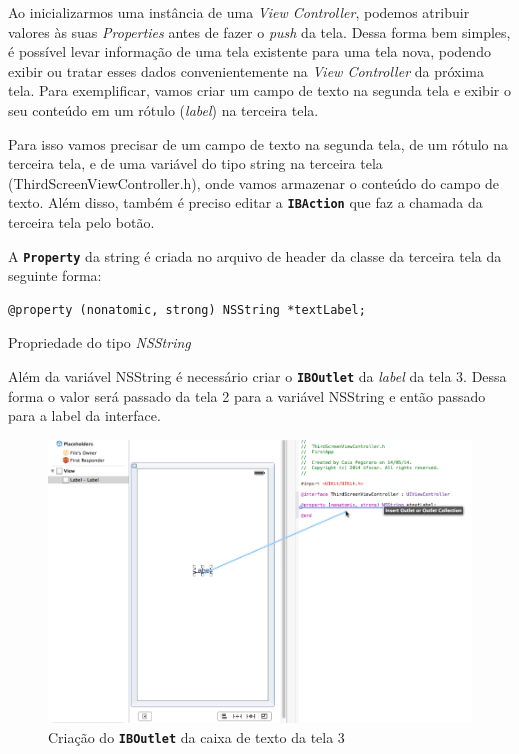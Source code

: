 \documentclass[a4paper,12pt,brazil,oneside]{book}
\begin{document}
Ao inicializarmos uma instância de uma \emph{View Controller}, podemos atribuir valores às suas \emph{Properties} antes de fazer o \emph{push} da tela. Dessa forma bem simples, é possível levar informação de uma tela existente para uma tela nova, podendo exibir ou tratar esses dados convenientemente na \emph{View Controller} da próxima tela. Para exemplificar, vamos criar um campo de texto na segunda tela e exibir o seu conteúdo em um rótulo (\emph{label}) na terceira tela.

Para isso vamos precisar de um campo de texto na segunda tela, de um rótulo na terceira tela, e de uma variável do tipo string na terceira tela (ThirdScreenViewController.h), onde vamos armazenar o conteúdo do campo de texto. Além disso, também é preciso editar a \texttt{\textbf{IBAction}} que faz a chamada da terceira tela pelo botão.

A \texttt{\textbf{Property}} da string é criada no arquivo de header da classe da terceira tela da seguinte forma:

\begin{listing}[H]
\begin{verbatim}
@property (nonatomic, strong) NSString *textLabel;
\end{verbatim}
\caption{Propriedade do tipo \emph{NSString}}
\end{listing}

Além da variável NSString é necessário criar o \texttt{\textbf{IBOutlet}} da \emph{label} da tela 3. Dessa forma o valor será passado da tela 2 para a variável NSString e então passado para a label da interface.

\begin{figure}[H]
  \centering
  \includegraphics[width=.99\textwidth]{figuras/3/tela_novo_projeto_45.png}
  \caption{Criação do \texttt{\textbf{IBOutlet}} da caixa de texto da tela 3}
  \label{fig:a}
\end{figure} 
\end{document}
